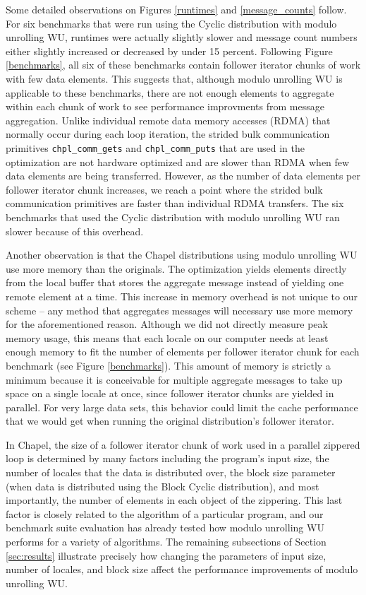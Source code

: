 Some detailed observations on Figures \ref{runtimes} and \ref{message_counts} follow. For six benchmarks that were run using the Cyclic distribution with modulo unrolling WU, runtimes were actually slightly slower and message count numbers either slightly increased or decreased by under 15 percent. Following Figure \ref{benchmarks}, all six of these benchmarks contain follower iterator chunks of work with few data elements. This suggests that, although modulo unrolling WU is applicable to these benchmarks, there are not enough elements to aggregate within each chunk of work to see performance improvments from message aggregation. Unlike individual remote data memory accesses (RDMA) that normally occur during each loop iteration, the strided bulk communication primitives \texttt{chpl\_comm\_gets} and \texttt{chpl\_comm\_puts} that are used in the optimization are not hardware optimized and are slower than RDMA when few data elements are being transferred. However, as the number of data elements per follower iterator chunk increases, we reach a point where the strided bulk communication primitives are faster than individual RDMA transfers. The six benchmarks that used the Cyclic distribution with modulo unrolling WU ran slower because of this overhead. 

Another observation is that the Chapel distributions using modulo unrolling WU use more memory than the originals. The optimization yields elements directly from the local buffer that stores the aggregate message instead of yielding one remote element at a time. This increase in memory overhead is not unique to our scheme -- any method that aggregates messages will necessary use more memory for the aforementioned reason. Although we did not directly measure peak memory usage, this means that each locale on our computer needs at least enough memory to fit the number of elements per follower iterator chunk for each benchmark (see Figure \ref{benchmarks}). This amount of memory is strictly a minimum because it is conceivable for multiple aggregate messages to take up space on a single locale at once, since follower iterator chunks are yielded in parallel. For very large data sets, this behavior could limit the cache performance that we would get when running the original distribution's follower iterator. 

In Chapel, the size of a follower iterator chunk of work used in a parallel zippered loop is determined by many factors including the program's input size, the number of locales that the data is distributed over, the block size parameter (when data is distributed using the Block Cyclic distribution), and most importantly, the number of elements in each object of the zippering. This last factor is closely related to the algorithm of a particular program, and our benchmark suite evaluation has already tested how modulo unrolling WU performs for a variety of algorithms. The remaining subsections of Section \ref{sec:results} illustrate precisely how changing the parameters of input size, number of locales, and block size affect the performance improvements of modulo unrolling WU.

